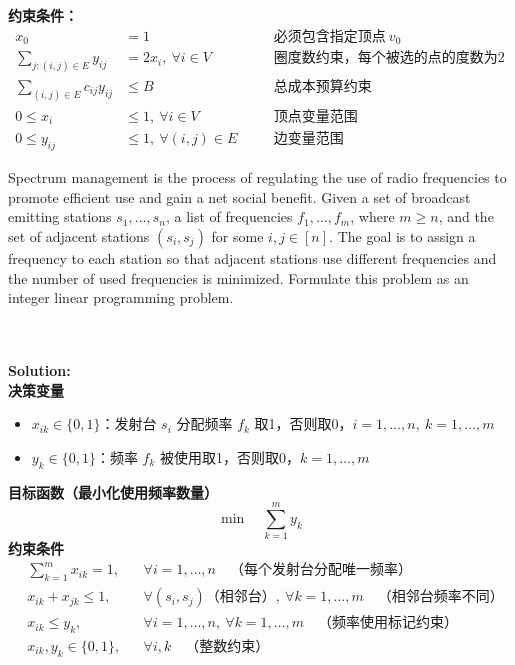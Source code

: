 \documentclass{article}
\newcounter{exercise}
\newcommand{\<}{
    \langle}
\renewcommand{\>}{
    \rangle}
\begin{document}
{\noindent\textbf{约束条件：}
\begin{align*}
x_0 &= 1 \quad &&\text{必须包含指定顶点} \ v_0 \\
\sum_{j:(i,j) \in E} y_{ij} &= 2x_i, \ \forall i \in V \quad &&\text{圈度数约束，每个被选的点的度数为2} \\
\sum_{(i,j) \in E} c_{ij} y_{ij} &\le B \quad &&\text{总成本预算约束} \\
0 \le x_i &\le 1, \ \forall i \in V \quad &&\text{顶点变量范围} \\
0 \le y_{ij} &\le 1, \ \forall (i,j) \in E \quad &&\text{边变量范围}
\end{align*}


\begin{exercise}
Spectrum management is the process of regulating the use of radio frequencies
to promote efficient use and gain a net social benefit. Given a set of broadcast
emitting stations $s_1, . . . , s_n$, a list of frequencies $f_1, . . . , f_m$, where $m \ge n$, and
the set of adjacent stations ${(s_i
, s_j )}$ for some $i, j \in [n]$. The goal is to assign
a frequency to each station so that adjacent stations use different frequencies
and the number of used frequencies is minimized. Formulate this problem as an
integer linear programming problem.
\end{exercise}
\\\\
\noindent\textbf{Solution:}
\\
\noindent\textbf{决策变量}\\
\begin{itemize}
    \item \( x_{ik} \in \{0,1\} \)：发射台 \( s_i \) 分配频率 \( f_k \) 取1，否则取0，\( i=1,\dots,n,\ k=1,\dots,m \)
    \item \( y_k \in \{0,1\} \)：频率 \( f_k \) 被使用取1，否则取0，\( k=1,\dots,m \)
\end{itemize}
\noindent\textbf{目标函数（最小化使用频率数量）}\\
\[
\min \quad \sum_{k=1}^{m} y_k
\]
\noindent\textbf{约束条件}\\
\begin{align*}
    &\sum_{k=1}^{m} x_{ik} = 1, && \forall i = 1,\dots,n \quad \text{（每个发射台分配唯一频率）} \\
    &x_{ik} + x_{jk} \leq 1, && \forall (s_i,s_j) \text{（相邻台）},\ \forall k = 1,\dots,m \quad \text{（相邻台频率不同）} \\
    &x_{ik} \leq y_k, && \forall i=1,\dots,n,\ \forall k=1,\dots,m \quad \text{（频率使用标记约束）} \\
    &x_{ik}, y_k \in \{0,1\}, && \forall i,k \quad \text{（整数约束）}
\end{align*}


}
\end{document}
